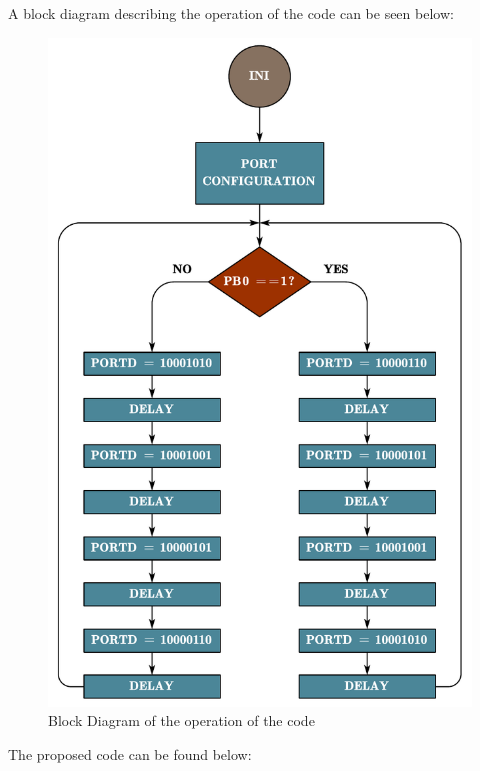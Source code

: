 A block diagram describing the operation of the code can be seen below:

\begin{figure}[H]
    \centering
    \includegraphics[scale = 0.6]{Graphics/MICROS/Practice 1/BLOCK-DIAGRAM.pdf}
    \caption{Block Diagram of the operation of the code}
    \label{fig:BLOCK_DIAG_STEPPER}
\end{figure}

\clearpage

The proposed code can be found below:


\vspace{-0.5cm}

